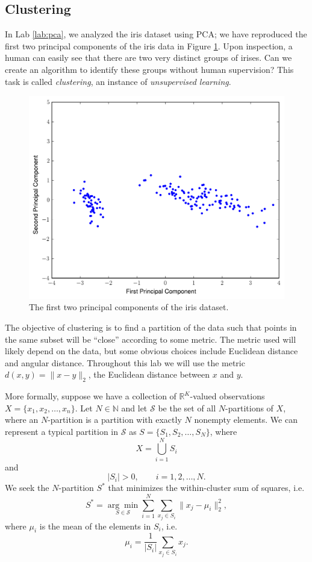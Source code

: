 
\subsection*{Clustering}
In Lab \ref{lab:pca}, we analyzed the iris dataset using PCA; we have reproduced the first two principal components of the iris data in Figure \ref{fig:iris_data}.
Upon inspection, a human can easily see that there are two very distinct groups of irises.
Can we create an algorithm to identify these groups without human supervision?
This task is called \emph{clustering}, an instance of \emph{unsupervised learning}.

\begin{figure}
\centering
\includegraphics[width=\textwidth]{iris_pca.pdf}
\caption{The first two principal components of the iris dataset.}
\label{fig:iris_data}
\end{figure}

The objective of clustering is to find a partition of the data such that points in the same subset will be ``close'' according to some metric.
The metric used will likely depend on the data, but some obvious choices include Euclidean distance and angular distance.
Throughout this lab we will use the metric $d(x,y) = \|x-y\|_2$, the Euclidean distance between $x$ and $y$.

More formally, suppose we have a collection of $\mathbb{R}^K$-valued observations $X = \{x_1,x_2,\ldots,x_n\}$.
Let $N \in \mathbb{N}$ and let $\mathcal{S}$ be the set of all $N$-partitions of $X$, where an $N$-partition is a partition with exactly $N$ nonempty elements.
We can represent a typical partition in $\mathcal{S}$ as $S = \{S_1,S_2,\ldots,S_N\}$, where
\[
X = \bigcup_{i=1}^N S_i
\]
and
\[
|S_i| > 0, \qquad i=1,2,\ldots,N.
\]
We seek the $N$-partition $S^*$ that minimizes the within-cluster sum of squares, i.e.
\[
S^* = \underset{S\in\mathcal{S}}{\arg\min} \sum_{i=1}^N\sum_{x_j\in S_i}\|x_j-\mu_i\|_2^2,
\]
where $\mu_i$ is the mean of the elements in $S_i$, i.e.
\[
\mu_i = \frac{1}{|S_i|}\sum_{x_j\in S_i}x_j.
\]

